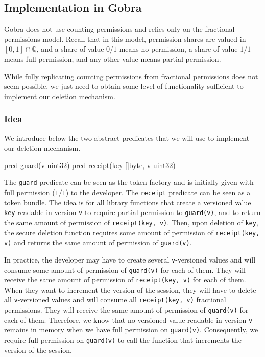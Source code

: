 
\subsection{Implementation in Gobra}
\label{sec:implementation-in-gobra}

Gobra does not use counting permissions and relies only on the fractional permissions model.
Recall that in this model, permission shares are valued in $[0,1]\cap\mathbb{Q}$, and a share of value $0/1$ means no permission, a share of value $1/1$ means full permission, and any other value means partial permission.

While fully replicating counting permissions from fractional permissions does not seem possible, we just need to obtain some level of functionality sufficient to implement our deletion mechanism.

\subsubsection{Idea}
\label{sec:counting-permissions-idea}

We introduce below the two abstract predicates that we will use to implement our deletion mechanism.

\begin{gobra}
pred guard(v uint32)
pred receipt(key []byte, v uint32)
\end{gobra}

The \texttt{guard} predicate can be seen as the token factory and is initially given with full permission ($1/1$) to the developer.
The \texttt{receipt} predicate can be seen as a token bundle.
The idea is for all library functions that create a versioned value \texttt{key} readable in version \texttt{v} to require partial permission to \texttt{guard(v)}, and to return the same amount of permission of \texttt{receipt(key, v)}.
Then, upon deletion of \texttt{key}, the secure deletion function requires some amount of permission of \texttt{receipt(key, v)} and returns the same amount of permission of \texttt{guard(v)}.

In practice, the developer may have to create several \texttt{v}-versioned values and will consume some amount of permission of \texttt{guard(v)} for each of them.
They will receive the same amount of permission of \texttt{receipt(key, v)} for each of them.
When they want to increment the version of the session, they will have to delete all \texttt{v}-versioned values and will consume all \texttt{receipt(key, v)} fractional permissions.
They will receive the same amount of permission of \texttt{guard(v)} for each of them.
Therefore, we know that no versioned value readable in version \texttt{v} remains in memory when we have full permission on \texttt{guard(v)}.
Consequently, we require full permission on \texttt{guard(v)} to call the function that increments the version of the session.

